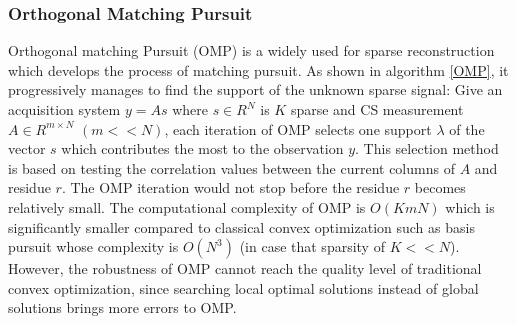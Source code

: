 \subsubsection{Orthogonal Matching Pursuit}
Orthogonal matching Pursuit (OMP)\cite{mallat1993matching} is a widely used for sparse reconstruction which develops the process of matching pursuit. As shown in algorithm \ref{OMP}, it progressively manages to find the support of the unknown sparse signal: Give an acquisition system $y = As$ where $s \in R^N$ is $K$ sparse and CS measurement $A \in R^{m \times N}$ $(m << N)$, each iteration of OMP selects one support $\lambda$ of the vector $s$ which contributes the most to the observation $y$. This selection method is based on testing the correlation values between the current columns of $A$ and residue $r$. The OMP iteration would not stop before the residue $r$ becomes relatively small. 
The computational complexity of OMP is $O(KmN)$ which is significantly smaller compared to classical convex optimization such as basis pursuit whose complexity is $O(N^3)$ (in case that sparsity of $K << N$)\cite{dai2009subspace}. However, the robustness of OMP cannot reach the quality level of traditional convex optimization, since searching local optimal solutions instead of global solutions brings more errors to OMP.  

